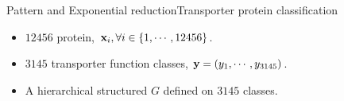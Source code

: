 \documentclass[first=dgreen,second=purple,logo=red]{aaltoslides}
\begin{document}
%
\begin{frame}{Pattern  and Exponential reduction}{Transporter protein classification \cite{su2015transporter}}
	\begin{itemize}\footnotesize
		\item $12456$ protein, $\mathbf {x}_i,\forall i\in\{1,\cdots,12456\}$.
		\item $3145$ transporter function classes, $\mathbf {y}=(y_{1},\cdots,y_{3145})$.
		\item A hierarchical structured $G$ defined on $3145$ classes.\\
		\begin{center}

\end{center}
\end{itemize}
\end{frame}
\end{document}
